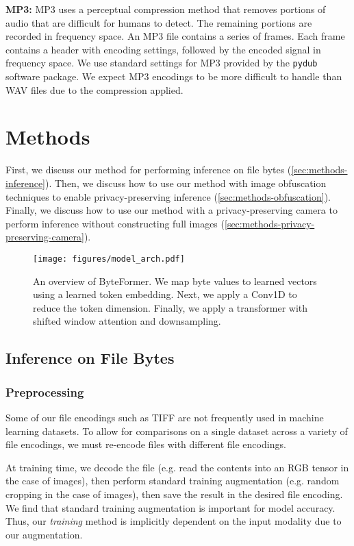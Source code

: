 \textbf{MP3:} MP3 \cite{mp3} uses a perceptual compression method that removes portions of audio that are difficult for humans to detect. The remaining portions are recorded in frequency space. An MP3 file contains a series of frames. Each frame contains a header with encoding settings, followed by the encoded signal in frequency space. We use standard settings for MP3 provided by the {\tt pydub} \cite{pydub} software package. We expect MP3 encodings to be more difficult to handle than WAV files due to the compression applied.

\section{Methods} \label{sec:methods}
First, we discuss our method for performing inference on file bytes (\autoref{sec:methods-inference}). Then, we discuss how to use our method with image obfuscation techniques to enable privacy-preserving inference (\autoref{sec:methods-obfuscation}). Finally, we discuss how to use our method with a privacy-preserving camera to perform inference without constructing full images (\autoref{sec:methods-privacy-preserving-camera}).

\begin{figure}
    \centering
    \texttt{[image: figures/model\_arch.pdf]}
    \caption{An overview of ByteFormer. We map byte values to learned vectors using a learned token embedding. Next, we apply a Conv1D to reduce the token dimension. Finally, we apply a transformer with shifted window attention and downsampling.}
    \label{fig:model}
\end{figure}

\subsection{Inference on File Bytes} \label{sec:methods-inference}
\subsubsection{Preprocessing} \label{sec:methods-preprocessing}
Some of our file encodings such as TIFF are not frequently used in machine learning datasets. To allow for comparisons on a single dataset across a variety of file encodings, we must re-encode files with different file encodings.

At training time, we decode the file (e.g. read the contents into an RGB tensor in the case of images), then perform standard training augmentation (e.g. random cropping in the case of images), then save the result in the desired file encoding. We find that standard training augmentation is important for model accuracy. Thus, our \textit{training} method is implicitly dependent on the input modality due to our augmentation.

